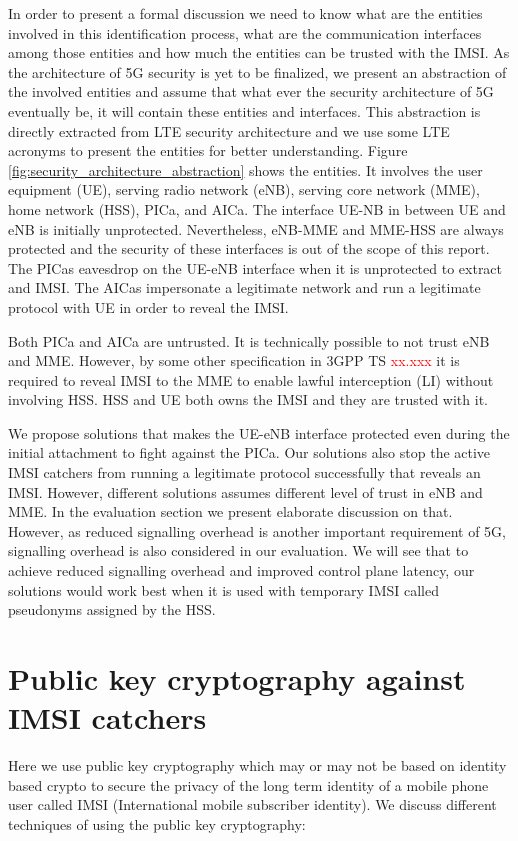 \documentclass[lnicst,sechang,a4paper]{svmultln}
\begin{document}
In order to present a formal discussion we need to know what are the entities involved in this identification process, what are the communication interfaces among those entities and how much the entities can be trusted with the IMSI.  As the architecture of 5G security is yet to be finalized, we present an abstraction of the involved entities and assume that what ever the security architecture of 5G eventually be, it will contain these entities and interfaces. This abstraction is directly extracted from LTE security architecture and we use some LTE acronyms to present the entities for better understanding. Figure \textcolor{red}{\ref{fig:security_architecture_abstraction}} shows the entities. It involves the user equipment (UE), serving radio network (eNB), serving core network (MME), home network (HSS), PICa, and AICa. The interface  UE-NB in between UE and eNB is initially unprotected. Nevertheless, eNB-MME and MME-HSS are always protected and the security of these interfaces is out of the scope of this report. The PICas eavesdrop on the UE-eNB interface when it is unprotected to extract and IMSI. The AICas impersonate a legitimate network and run a legitimate protocol with UE in order to reveal the IMSI. 

Both PICa and AICa are untrusted. It is technically possible to not trust eNB and MME. However, by some other specification in 3GPP TS \textcolor{red}{xx.xxx} it is required to reveal IMSI to the MME to enable lawful interception (LI) without involving HSS. HSS and UE both owns the IMSI and they are trusted with it.

We propose solutions that makes the UE-eNB interface protected even during the initial attachment to fight against the PICa. Our solutions also stop the active IMSI catchers from running a legitimate protocol successfully that reveals an IMSI. However, different solutions assumes different level of trust in eNB and MME. In the evaluation section we present elaborate discussion on that. However, as reduced signalling overhead is another important requirement of 5G, signalling overhead is also considered in our evaluation. We will see that to achieve reduced signalling overhead and improved control plane latency, our solutions would work best when it is used with temporary IMSI called pseudonyms assigned by the HSS.

\section{Public key cryptography against IMSI catchers}
Here we use public key cryptography which may or may not be based on identity based crypto to secure the privacy of the long term identity of a mobile phone user called IMSI (International mobile subscriber identity). We discuss different techniques of using the public key cryptography:
\end{document}
